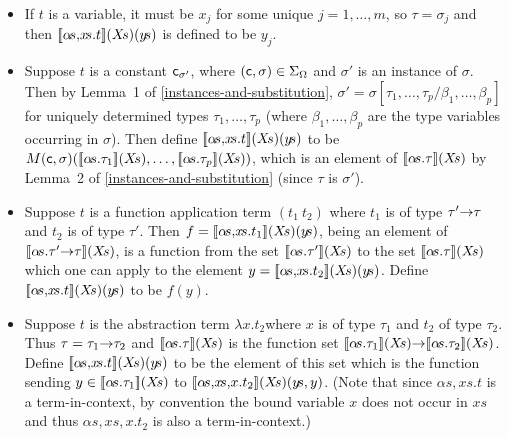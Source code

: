 \begin{itemize}

\item
If $t$ is a variable, it must be $x_{j}$ for some unique
$j=1,\ldots,m$, so $\tau=\sigma_{j}$ and then
$[\![\alpha\!s,\!x\!s.t]\!](X\!s)(y\!s)$ is defined to be $y_{j}$.

\item
Suppose $t$ is a constant $\mbox{\normalsize\sf c}_{\sigma'}$, where
$(\mbox{\normalsize\sf c},\sigma)\in\Sigma_{\Omega}$ and $\sigma'$ is an instance of
$\sigma$.  Then by Lemma~1 of \ref{instances-and-substitution},
$\sigma'=\sigma[\tau_{1},\ldots,\tau_{p}/\beta_{1},\ldots,\beta_{p}]$
for uniquely determined types $\tau_{1},\ldots,\tau_{p}$ (where
$\beta_{1},\ldots,\beta_{p}$ are the type variables occurring in
$\sigma$). Then define $[\![\alpha\!s,\!x\!s.t]\!](X\!s)(y\!s)$ to be
$M(\con{c},\sigma)(\den{\alpha\!s.\tau_{1}}(X\!s),
\ldots,\den{\alpha\!s.\tau_{p}}(X\!s))$,
which is an element of $[\![\alpha\!s.\tau]\!](X\!s)$ by Lemma~2 of
\ref{instances-and-substitution} (since $\tau$ is $\sigma'$).

\item
Suppose $t$ is a function application term $(t_{1}\
t_{2})$ where $t_{1}$ is of type
$\tau'{\to}\tau$ and $t_{2}$ is of type $\tau'$. Then
$f=[\![\alpha\!s,\!x\!s.t_{1}]\!](X\!s)(y\!s)$, being an element of
$[\![\alpha\!s.\tau'{\to}\tau]\!](X\!s)$, is a function from the set
$[\![\alpha\!s.\tau']\!](X\!s)$ to the set $[\![\alpha\!s.\tau]\!](X\!s)$
which one can apply to the element
$y=[\![\alpha\!s,\!x\!s.t_{2}]\!](X\!s)(y\!s)$. Define
$[\![\alpha\!s,\!x\!s.t]\!](X\!s)(y\!s)$ to be $f(y)$.

\item Suppose $t$ is the abstraction
term $\lambda x.t_{2}$where $x$ is of type $\tau_{1}$ and $t_{2}$ of
type $\tau_{2}$. Thus $\tau=\tau_{1}{\to}\tau_{2}$ and
$[\![\alpha\!s.\tau]\!](X\!s)$ is the function set
$\den{\alpha\!s.\tau_{1}}(X\!s)\fun\den{\alpha\!s.\tau_{2}}(X\!s)$.
Define $[\![\alpha\!s,\!x\!s.t]\!](X\!s)(y\!s)$ to be the element of
this set which is the function sending
$y\in[\![\alpha\!s.\tau_{1}]\!](X\!s)$ to
$\den{\alpha\!s,\!x\!s,\!x.t_{2}}(X\!s)(y\!s,y)$. (Note that since
$\alpha\!s,\!x\!s.t$ is a term-in-context, by convention the bound
variable $x$ does not occur in $x\!s$ and thus
$\alpha\!s,\!x\!s,\!x.t_{2}$ is also a term-in-context.)
\end{itemize}
